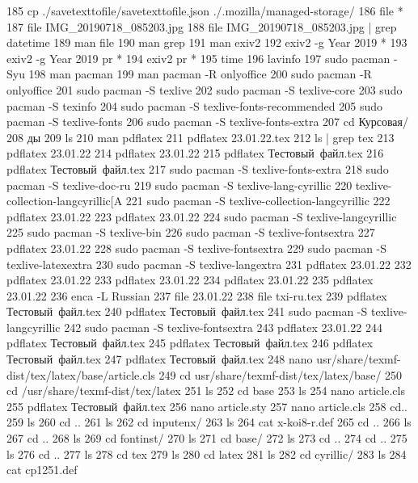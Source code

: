   185  cp ./savetexttofile/savetexttofile.json ./.mozilla/managed-storage/
  186  file *
  187  file IMG_20190718_085203.jpg 
  188  file IMG_20190718_085203.jpg | grep datetime
  189  man file
  190  man grep
  191  man exiv2 
  192  exiv2 -g Year 2019 *
  193  exiv2 -g Year 2019 pr *
  194  exiv2 pr *
  195  time
  196  lavinfo 
  197  sudo pacman -Syu
  198  man pacman
  199  man pacman -R onlyoffice
  200  sudo pacman -R onlyoffice
  201  sudo pacman -S texlive
  202  sudo pacman -S texlive-core
  203  sudo pacman -S texinfo
  204  sudo pacman -S texlive-fonts-recommended
  205  sudo pacman -S texlive-fonts
  206  sudo pacman -S texlive-fonts-extra
  207  cd Курсовая/
  208  ды
  209  ls
  210  man pdflatex
  211  pdflatex 23.01.22.tex
  212  ls | grep tex
  213  pdflatex 23.01.22
  214  pdflatex 23.01.22
  215  pdflatex Тестовый\ файл.tex 
  216  pdflatex Тестовый\ файл.tex 
  217  sudo pacman -S texlive-fonts-extra
  218  sudo pacman -S texlive-doc-ru
  219  sudo pacman -S texlive-lang-cyrillic
  220  texlive-collection-langcyrillic[A
  221  sudo pacman -S texlive-collection-langcyrillic
  222  pdflatex 23.01.22
  223  pdflatex 23.01.22
  224  sudo pacman -S texlive-langcyrillic
  225  sudo pacman -S texlive-bin
  226  sudo pacman -S texlive-fontsextra
  227  pdflatex 23.01.22
  228  sudo pacman -S texlive-fontsextra
  229  sudo pacman -S texlive-latexextra
  230  sudo pacman -S texlive-langextra
  231  pdflatex 23.01.22
  232  pdflatex 23.01.22
  233  pdflatex 23.01.22
  234  pdflatex 23.01.22
  235  pdflatex 23.01.22
  236  enca -L Russian
  237  file 23.01.22 
  238  file txi-ru.tex 
  239  pdflatex Тестовый\ файл.tex 
  240  pdflatex Тестовый\ файл.tex 
  241  sudo pacman -S texlive-langcyrillic
  242  sudo pacman -S texlive-fontsextra
  243  pdflatex 23.01.22
  244  pdflatex Тестовый\ файл.tex 
  245  pdflatex Тестовый\ файл.tex 
  246  pdflatex Тестовый\ файл.tex 
  247  pdflatex Тестовый\ файл.tex 
  248  nano usr/share/texmf-dist/tex/latex/base/article.cls
  249  cd usr/share/texmf-dist/tex/latex/base/
  250  cd /usr/share/texmf-dist/tex/latex
  251  ls
  252  cd base
  253  ls
  254  nano article.cls 
  255  pdflatex Тестовый\ файл.tex 
  256  nano article.sty 
  257  nano article.cls 
  258  cd..
  259  ls
  260  cd ..
  261  ls
  262  cd inputenx/
  263  ls
  264  cat x-koi8-r.def 
  265  cd ..
  266  ls
  267  cd ..
  268  ls
  269  cd fontinst/
  270  ls
  271  cd base/
  272  ls
  273  cd ..
  274  cd ..
  275  ls
  276  cd ..
  277  ls
  278  cd tex
  279  ls
  280  cd latex
  281  ls
  282  cd cyrillic/
  283  ls
  284  cat cp1251.def 
